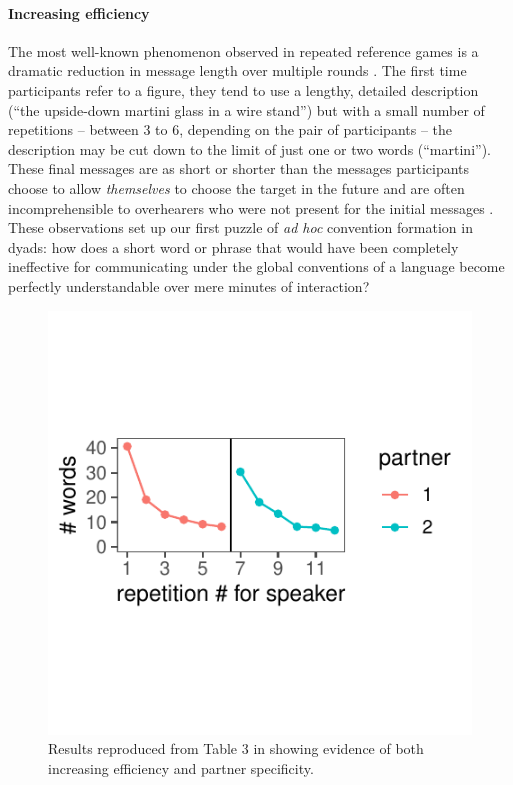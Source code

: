 \paragraph{Increasing efficiency}

The most well-known phenomenon observed in repeated reference games is a dramatic reduction in message length over multiple rounds \cite{krauss_changes_1964, ClarkWilkesGibbs86_ReferringCollaborative, hawkins2020characterizing}. 
The first time participants refer to a figure, they tend to use a lengthy, detailed description (``the upside-down martini glass in a wire stand'') but with a small number of repetitions -- between 3 to 6, depending on the pair of participants -- the description may be cut down to the limit of just one or two words (``martini''). 
These final messages are as short or shorter than the messages participants choose to allow \emph{themselves} to choose the target in the future  \cite{FussellKrauss89_IntendedAudienceCommonGround} and are often incomprehensible to overhearers who were not present for the initial messages \cite{SchoberClark89_Overhearers}.
These observations set up our first puzzle of \emph{ad hoc} convention formation in dyads: how does a short word or phrase that would have been completely ineffective for communicating under the global conventions of a language become perfectly understandable over mere minutes of interaction? 

\begin{figure}[t!]
\centering
\includegraphics[scale=1]{./figures/clark92}
\caption{Results reproduced from Table 3 in \protect{} showing evidence of both increasing efficiency and partner specificity.}
\label{fig:clark92}
\end{figure}

